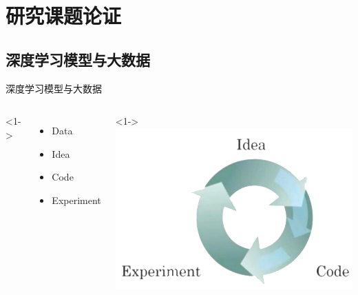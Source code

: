 \section{研究课题论证}

\subsection{深度学习模型与大数据}

\begin{xframe}{深度学习模型与大数据}

    \begin{columns}
        <1->
        \begin{itemize}
            \item {Data\\
            }
            \item {Idea\\
            }
            \item {Code\\
            }
            \item {Experiment\\
            }
        \end{itemize}
        <1->
            \includegraphics[width=\textwidth,totalheight=0.5\textheight]{./style/images/circle.png}

    \end{columns}

\end{xframe}


